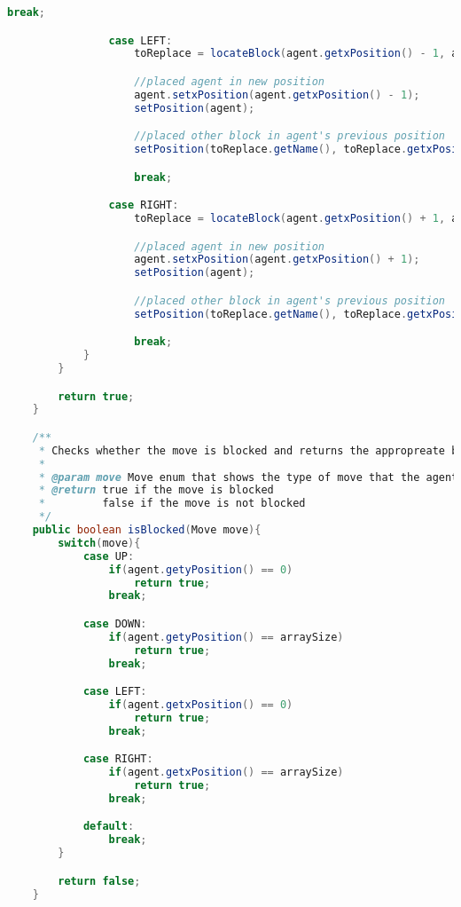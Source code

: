 \documentclass[a4paper, 11pt]{article} %
\begin{document}
\begin{lstlisting}[language=java]
                    break;

                case LEFT:
                    toReplace = locateBlock(agent.getxPosition() - 1, agent.getyPosition());

                    //placed agent in new position
                    agent.setxPosition(agent.getxPosition() - 1);
                    setPosition(agent);

                    //placed other block in agent's previous position
                    setPosition(toReplace.getName(), toReplace.getxPosition() + 1, toReplace.getyPosition());

                    break;

                case RIGHT:
                    toReplace = locateBlock(agent.getxPosition() + 1, agent.getyPosition());

                    //placed agent in new position
                    agent.setxPosition(agent.getxPosition() + 1);
                    setPosition(agent);

                    //placed other block in agent's previous position
                    setPosition(toReplace.getName(), toReplace.getxPosition() - 1, toReplace.getyPosition());

                    break;
            }
        }

        return true;
    }

    /**
     * Checks whether the move is blocked and returns the appropreate boolean
     *
     * @param move Move enum that shows the type of move that the agent wants to perform
     * @return true if the move is blocked
     *         false if the move is not blocked
     */
    public boolean isBlocked(Move move){
        switch(move){
            case UP:
                if(agent.getyPosition() == 0)
                    return true;
                break;

            case DOWN:
                if(agent.getyPosition() == arraySize)
                    return true;
                break;

            case LEFT:
                if(agent.getxPosition() == 0)
                    return true;
                break;

            case RIGHT:
                if(agent.getxPosition() == arraySize)
                    return true;
                break;

            default:
                break;
        }

        return false;
    }


\end{lstlisting}
\end{document}
